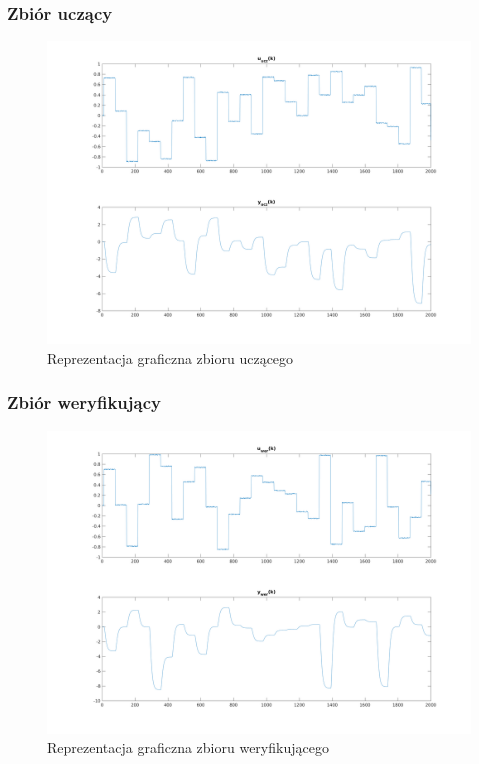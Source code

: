 \documentclass[a4paper, 11pt]{article}
\begin{document}
\subsubsection{Zbiór uczący}
\begin{figure}[H]
\centering
\includegraphics[scale=0.50]{dane_dyn_ucz.png}
\caption{Reprezentacja graficzna zbioru uczącego }
\label{}
\end{figure}

\subsubsection{Zbiór weryfikujący}
\begin{figure}[H]
\centering
\includegraphics[scale=0.50]{dane_dyn_wer.png}
\caption{Reprezentacja graficzna zbioru weryfikującego}
\label{}
\end{figure}
\end{document}
